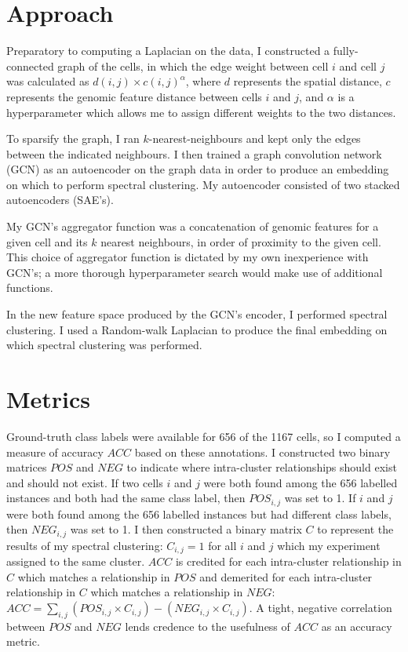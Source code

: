 \documentclass{article}
\newcommand{\nData}{1167}
\begin{document}
\section{Approach}

Preparatory to computing a Laplacian on the data, I constructed a fully-connected graph of the cells, in which the edge weight between cell $i$ and cell $j$ was calculated as $d(i,j) \times c(i,j)^\alpha$, where $d$ represents the spatial distance, $c$ represents the genomic feature distance between cells $i$ and $j$, and $\alpha$ is a hyperparameter which allows me to assign different weights to the two distances.

To sparsify the graph, I ran $k$-nearest-neighbours and kept only the edges between the indicated neighbours. I then trained a graph convolution network (GCN) as an autoencoder on the graph data in order to produce an embedding on which to perform spectral clustering. My autoencoder consisted of two stacked autoencoders (SAE's).

My GCN's aggregator function was a concatenation of genomic features for a given cell and its $k$ nearest neighbours, in order of proximity to the given cell. This choice of aggregator function is dictated by my own inexperience with GCN's; a more thorough hyperparameter search would make use of additional functions.

In the new feature space produced by the GCN's encoder, I performed spectral clustering. I used a Random-walk Laplacian to produce the final embedding on which spectral clustering was performed.

\section{Metrics}

Ground-truth class labels were available for 656 of the \nData{} cells, so I computed a measure of accuracy $ACC$ based on these annotations. I constructed two binary matrices $POS$ and $NEG$ to indicate where intra-cluster relationships should exist and should not exist. If two cells $i$ and $j$ were both found among the 656 labelled instances and both had the same class label, then $POS_{i,j}$ was set to 1. If $i$ and $j$ were both found among the 656 labelled instances but had different class labels, then $NEG_{i,j}$ was set to 1. I then constructed a binary matrix $C$ to represent the results of my spectral clustering: $C_{i,j} = 1$ for all $i$ and $j$ which my experiment assigned to the same cluster. $ACC$ is credited for each intra-cluster relationship in $C$ which matches a relationship in $POS$ and demerited for each intra-cluster relationship in $C$ which matches a relationship in $NEG$: $ACC = \sum_{i,j} (POS_{i,j}\times C_{i,j}) - (NEG_{i,j}\times C_{i,j})$. A tight, negative correlation between $POS$ and $NEG$ lends credence to the usefulness of $ACC$ as an accuracy metric. 
\end{document}
